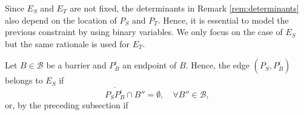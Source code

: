 \documentclass[a4paper]{elsarticle}
\newcommand{\B}{{\mathcal B}}
\newcommand{\ES}{{E^{}_{S}}}
\newcommand{\ET}{{E^{}_{T}}}
\begin{document}


%







Since $\ES$ and $\ET$ are not fixed, the determinants in Remark \ref{rem:determinants} also depend on the location of $P_S$ and $P^{}_T$.  Hence, it is essential to model the previous constraint by using binary variables. We only focus on the case of $E_S$ but the same rationale is used for $E_T$.

Let $B\in\B$ be a barrier and $P_B^i$ an endpoint of $B$. Hence, the edge $(P^{}_S, P_B^i)$ belongs to $\ES$ if
$$\overline{P^{}_SP^i_B}\cap B''=\emptyset,\quad \forall B''\in\B,$$
or,
by the preceding subsection if

\end{document}
